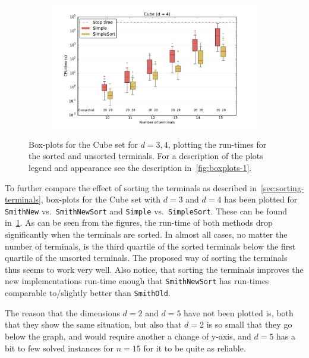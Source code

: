 \begin{figure}[htbp]
\begin{subfigure}[t]{0.5\textwidth}
  \end{subfigure}%
  \begin{subfigure}[t]{0.5\textwidth}
    \includegraphics[width=\textwidth]{gfx/boxplots/plot_nvst_boxplot_d4_Cube_3}
  \end{subfigure}%
  \caption[Box-plots: Unsorted terminals vs.\ sorted terminals]{Box-plots for
    the Cube set for $d = 3,4$, plotting the run-times for the sorted and
    unsorted terminals. For a description of the plots legend and appearance see
    the description in~\cref{fig:boxplots-1}.\label{fig:boxplots-2}}
\end{figure}

To further compare the effect of sorting the terminals as described
in~\cref{sec:sorting-terminals}, box-plots for the Cube set with $d = 3$ and $d
= 4$ has been plotted for \texttt{SmithNew} vs.\ \texttt{SmithNewSort} and
\texttt{Simple} vs.\ \texttt{SimpleSort}. These can be found
in~\cref{fig:boxplots-2}. As can be seen from the figures, the run-time of both
methods drop significantly when the terminals are sorted. In almost all cases,
no matter the number of terminals, is the third quartile of the sorted terminals
below the first quartile of the unsorted terminals. The proposed way of sorting
the terminals thus seems to work very well. Also notice, that sorting the
terminals improves the new implementations run-time enough that
\texttt{SmithNewSort} has run-times comparable to/slightly better than
\texttt{SmithOld}.

The reason that the dimensions $d=2$ and $d=5$ have not been plotted is, both
that they show the same situation, but also that $d=2$ is so small that they go
below the graph, and would require another a change of y-axis, and $d=5$ has a
bit to few solved instances for $n=15$ for it to be quite as reliable.

